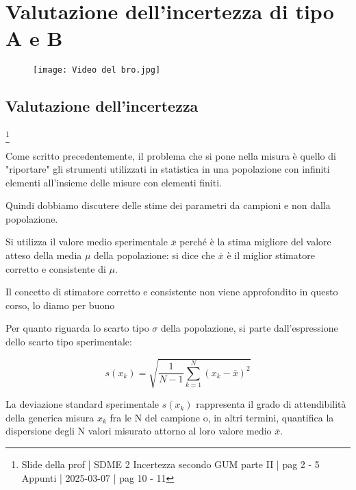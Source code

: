 \chapter{Valutazione dell'incertezza di tipo A e B}

\begin{figure}[h]
    \centering
    \texttt{[image: Video del bro.jpg]}
\end{figure}

\newpage 

\section{Valutazione dell'incertezza}
\footnote{Slide della prof | SDME 2 Incertezza secondo GUM parte II | pag 2 - 5 \\  
Appunti | 2025-03-07 | pag 10 - 11}

Come scritto precedentemente, il problema che si pone nella misura è quello di "riportare" gli strumenti utilizzati in statistica 
in una popolazione con infiniti elementi all'insieme delle misure con elementi finiti. \newline 

Quindi dobbiamo discutere delle stime dei parametri da campioni e non dalla popolazione. \newline 

Si utilizza il valore medio sperimentale $\overline{x}$ perché è la stima migliore del valore atteso della media $\mu$ della popolazione: 
si dice che $\overline{x}$ è il miglior stimatore corretto e consistente di $\mu$. \newline 

\begin{tcolorbox}
    Il concetto di stimatore corretto e consistente non viene approfondito in questo corso, lo diamo per buono
\end{tcolorbox}


Per quanto riguarda lo scarto tipo $\sigma$ della popolazione, 
si parte dall'espressione dello scarto tipo sperimentale: 

{
    \Large 
    \begin{equation}
        s(x_k)
        = 
        \sqrt
        {
            \frac{1}{N-1} \sum_{k = 1}^{N} 
            (x_k - \overline{x})^{2}
        }
    \end{equation}
}

La deviazione standard sperimentale $s(x_k)$ rappresenta il grado di attendibilità della generica misura $x_k$ 
fra le N del campione o, in altri termini, quantifica la dispersione degli N valori misurato attorno al loro valore medio $\overline{x}$. \newline 

